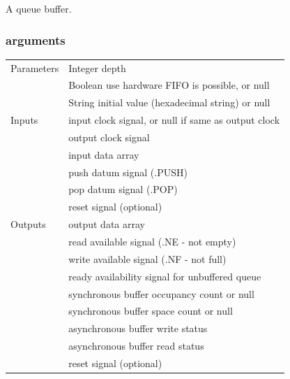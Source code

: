 \documentclass[10pt,a4paper,twoside,fleqn]{book}
\begin{document}
                    A queue buffer.

                \subsubsection{arguments}

                    \begin{tabular}{| l | l |}
                    \hline
                    Parameters  & Integer depth \\
                                & Boolean use hardware FIFO is possible, or null \\
                                & String initial value (hexadecimal string) or null \\
                    \hline
                    Inputs      & input clock signal, or null if same as output clock \\
                                & output clock signal \\
                                & input data array \\
                                & push datum signal (.PUSH) \\
                                & pop datum signal (.POP) \\
                                & reset signal (optional) \\
                    \hline
                    Outputs     & output data array                          \\
                                & read available signal (.NE - not empty)  \\
                                & write available signal (.NF - not full)    \\
                                & ready availability signal for unbuffered queue \\
                                & synchronous buffer occupancy count or null \\
                                & synchronous buffer space count or null     \\
                                & asynchronous buffer write status           \\
                                & asynchronous buffer read status            \\
                                & reset signal (optional) \\
                    \hline
                    \end{tabular}
\end{document}
